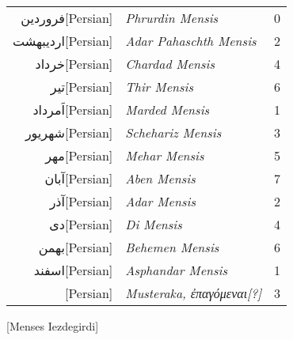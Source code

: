 %
\begin{tabnums} %
\normalsize
\centering
\renewcommand{\arraystretch}{1.000} %
\newcommand{\hts}{\small}
\newcommand{\cwd}{4em}
%
\newcommand{\da}{\scriptsize{†}}
\begin{tabular}{@{} r l c @{}}
\toprule
\textarabic{فروردین}[Persian] & \textit{Phrurdin Mensis} & 0 \\
\textarabic{اردیبهشت}[Persian] & \textit{Adar Pahaschth Mensis} & 2 \\
\textarabic{خرداد}[Persian] & \textit{Chardad Mensis} & 4 \\
\textarabic{تیر}[Persian] & \textit{Thir Mensis} & 6 \\
\textarabic{اَمرداد}[Persian] & \textit{Marded Mensis} & 1 \\
\textarabic{شهریور}[Persian] & \textit{Schehariz Mensis} & 3 \\
\textarabic{مهر}[Persian] & \textit{Mehar Mensis} & 5 \\
\textarabic{آبان}[Persian] & \textit{Aben Mensis} & 7 \\
\textarabic{آذر}[Persian] & \textit{Adar Mensis} & 2 \\
\textarabic{دی}[Persian] & \textit{Di Mensis} & 4 \\
\textarabic{بهمن}[Persian] & \textit{Behemen Mensis} & 6 \\
\textarabic{اسفند}[Persian] & \textit{Asphandar Mensis} & 1 \\
\textarabic{}[Persian] & \textit{Musteraka, \textgreek{ἐπαγόμεναι}[?]} & 3 \\
\bottomrule
\end{tabular}
%
\caption{[Menses Iezdegirdi]}
\label{tab:p211}
%
\end{tabnums}

